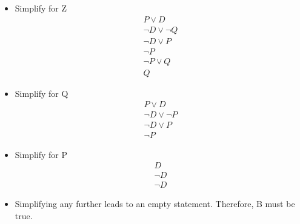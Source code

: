 \documentclass{article}
\begin{document}
\begin{itemize}
   \item Simplify for Z
   \begin{align*}
       P \lor D \\
       \neg D \lor \neg Q \\
       \neg D \lor P \\
       \neg P \\
       \neg P \lor Q \\
       Q
   \end{align*}
   
   \item Simplify for Q
   \begin{align*}
       P \lor D \\
       \neg D \lor \neg P \\
       \neg D \lor P \\
       \neg P
   \end{align*}
   
   \item Simplify for P
   \begin{align*}
       D \\
       \neg D \\
       \neg D
   \end{align*}
   
   \item Simplifying any further leads to an empty statement. Therefore, B must be true.
\end{itemize}
\end{document}
